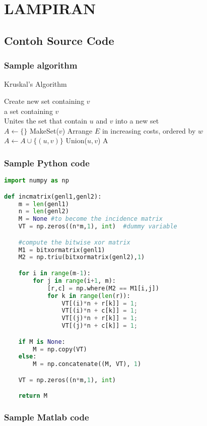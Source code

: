 \chapter*{LAMPIRAN}

\section{Contoh Source Code}

\subsection{Sample algorithm}
\begin{algorithm}
	\caption{Kruskal's Algorithm}\label{alg:kruskal}
	\begin{algorithmic}[1]
			\State Create new set containing $v$
		\EndProcedure \\
		
			\State\Return a set containing $v$
		\EndFunction \\
		
			\State Unites the set that contain $u$ and $v$ into a new set
		\EndProcedure \\
		
			\State $A \gets \{\}$
				\State MakeSet($v$)
			\EndFor
			\State Arrange $E$ in increasing costs, ordered by $w$
					\State $A \gets A \cup \{(u,v)\}$
					\State Union($u,v$)
				\EndIf
			\EndFor
			\State \Return A
		\EndFunction
	\end{algorithmic}
\end{algorithm}

\newpage
\subsection{Sample Python code}
\begin{lstlisting}[language=Python]
import numpy as np

def incmatrix(genl1,genl2):
	m = len(genl1)
	n = len(genl2)
	M = None #to become the incidence matrix
	VT = np.zeros((n*m,1), int)  #dummy variable

	#compute the bitwise xor matrix
	M1 = bitxormatrix(genl1)
	M2 = np.triu(bitxormatrix(genl2),1) 

	for i in range(m-1):
		for j in range(i+1, m):
			[r,c] = np.where(M2 == M1[i,j])
			for k in range(len(r)):
				VT[(i)*n + r[k]] = 1;
				VT[(i)*n + c[k]] = 1;
				VT[(j)*n + r[k]] = 1;
				VT[(j)*n + c[k]] = 1;

	if M is None:
		M = np.copy(VT)
	else:
		M = np.concatenate((M, VT), 1)

	VT = np.zeros((n*m,1), int)

	return M
\end{lstlisting}

\newpage
\subsection{Sample Matlab code}
